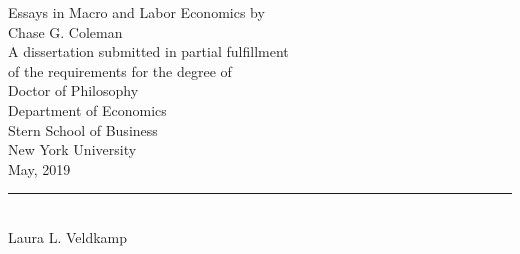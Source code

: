 \documentclass[12pt,letterpaper,oneside,final]{memoir}
\begin{document}
\fussy
{} %
\frontmatter
\hyphenation{}

\DoubleSpacing

\begin{center}


\thispagestyle{empty}
\vspace*{15mm} Essays in Macro and Labor Economics
\vspace{20mm}
by\\
\vspace{10mm}
Chase G. Coleman \\
\vspace{10mm}
A dissertation submitted in partial fulfillment\\
of the requirements for the degree of\\
Doctor of Philosophy\\
Department of Economics\\
Stern School of Business\\
New York University\\
May, 2019
\end{center}
\vspace{20mm}
\begin{flushright}
{\rule[0pt]{60mm}{0.1mm}}\\ %
Laura L. Veldkamp\\
\vspace{7.5mm}
\end{flushright}

\newpage




%
%

\end{document}
